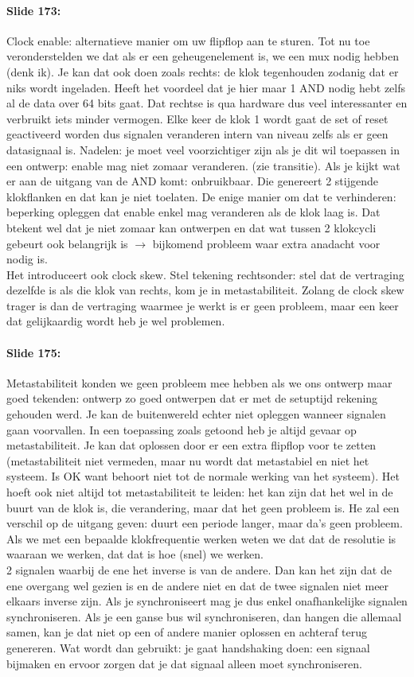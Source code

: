 \documentclass[10pt,a4paper]{book}
\begin{document}
\paragraph{Slide 173:} Clock enable: alternatieve manier om uw flipflop aan te sturen. Tot nu toe veronderstelden we dat als er een geheugenelement is, we een mux nodig hebben (denk ik). Je kan dat ook doen zoals rechts: de klok tegenhouden zodanig dat er niks wordt ingeladen. Heeft het voordeel dat je hier maar 1 AND nodig hebt zelfs al de data over 64 bits gaat. Dat rechtse is qua hardware dus veel interessanter en verbruikt iets minder vermogen. Elke keer de klok 1 wordt gaat de set of reset geactiveerd worden dus signalen veranderen intern van niveau zelfs als er geen datasignaal is. Nadelen: je moet veel voorzichtiger zijn als je dit wil toepassen in een ontwerp: enable mag niet zomaar veranderen. (zie transitie).  Als je kijkt wat er aan de uitgang van de AND komt: onbruikbaar. Die genereert 2 stijgende klokflanken en dat kan je niet toelaten. De enige manier om dat te verhinderen: beperking opleggen dat enable enkel mag veranderen als de klok laag is. Dat btekent wel dat je niet zomaar kan ontwerpen en dat wat tussen 2 klokcycli gebeurt ook belangrijk is $\rightarrow$ bijkomend probleem waar extra anadacht voor nodig is.\\
Het introduceert ook clock skew. Stel tekening rechtsonder: stel dat de vertraging dezelfde is als die klok van rechts, kom je in metastabiliteit. Zolang de clock skew trager is dan de vertraging waarmee je werkt is er geen probleem, maar een keer dat gelijkaardig wordt heb je wel problemen.

\paragraph{Slide 175:} Metastabiliteit konden we geen probleem mee hebben als we ons ontwerp maar goed tekenden: ontwerp zo goed ontwerpen dat er met de setuptijd rekening gehouden werd. Je kan de buitenwereld echter niet opleggen wanneer signalen gaan voorvallen. In een toepassing zoals getoond heb je altijd gevaar op metastabiliteit. Je kan dat oplossen door er een extra flipflop voor te zetten (metastabiliteit niet vermeden, maar nu wordt dat metastabiel en niet het systeem. Is OK want behoort niet tot de normale werking van het systeem). Het hoeft ook niet altijd tot metastabiliteit te leiden: het kan zijn dat het wel in de buurt van de klok is, die verandering, maar dat het geen probleem is. He zal een verschil op de uitgang geven: duurt een periode langer, maar da's geen probleem. Als we met een bepaalde klokfrequentie werken weten we dat dat de resolutie is waaraan we werken, dat dat is hoe (snel) we werken.\\
2 signalen waarbij de ene het inverse is van de andere. Dan kan het zijn dat de ene overgang wel gezien is en de andere niet en dat de twee signalen niet meer elkaars inverse zijn. Als je synchroniseert mag je dus enkel onafhankelijke signalen synchroniseren. Als je een ganse bus wil synchroniseren, dan hangen die allemaal samen, kan je dat niet op een of andere manier oplossen en achteraf terug genereren. Wat wordt dan gebruikt: je gaat handshaking doen: een signaal bijmaken en ervoor zorgen dat je dat signaal alleen moet synchroniseren.
\end{document}
